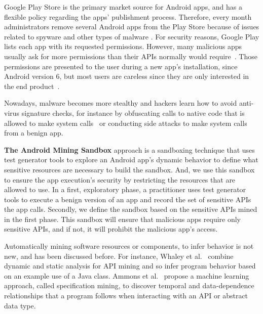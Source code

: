 Google Play Store is the primary market source for Android apps, and has a flexible policy regarding the apps' publishment process. Therefore, every month administrators remove several Android apps from the Play Store because of issues related to spyware and other types of malware \cite{DBLP:conf/msr/WangLL0X18}. For security reasons, Google Play lists each app with its requested permissions. However, many malicious apps usually ask for more permissions than their APIs normally would require~\cite{DBLP:conf/ccs/FeltCHSW11}. Those permissions are presented to the user during a new app's installation, since Android version 6, but most users are careless since they are only interested in the end product~\cite{DBLP:conf/soups/FeltHEHCW12}. 

Nowadays, malware becomes more stealthy and hackers learn how to avoid anti-virus signature checks, for instance by obfuscating calls to native code that is allowed to make system calls~\cite{DBLP:journals/corr/abs-2002-04540} or conducting side attacks to make system calls from a benign app.

\textbf{The Android Mining Sandbox} approach is a sandboxing technique that uses test generator tools to explore an Android app's dynamic behavior to define what sensitive resources are necessary to build the sandbox. And, we use this sandbox to ensure the app execution's security by restricting the resources that are allowed to use. In a first, exploratory phase, a practitioner uses test generator tools to execute a benign version of an app and record the set of sensitive APIs the app calls. Secondly, we define the sandbox based on the sensitive APIs mined in the first phase. This sandbox will ensure that malicious apps require only sensitive APIs, and if not, it will prohibit the malicious app's access.

Automatically mining software resources or components, to infer behavior is not new, and has been discussed before. For instance, Whaley et al.~\cite{DBLP:conf/issta/WhaleyML02} combine dynamic and static analysis for API mining and so infer program behavior based on an example use of a Java class. Ammons et al.~\cite{DBLP:conf/popl/AmmonsBL02} propose a machine learning approach, called specification mining, to discover temporal and data-dependence relationships that a program follows when interacting with an API or abstract data type.

